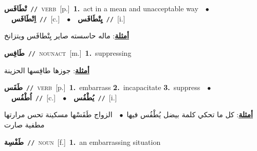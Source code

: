 \documentclass[10pt,a4paper,twoside]{article} %
\begin{document}
\begin{multicols}{2}
{\setlength\topsep{0pt}\textbf{\foreignlanguage{arabic}{تْطَافَس}}\ {\color{gray}\texttt{//}\color{black}}\ \textsc{verb}\ [p.]\ \textbf{1.}~act in a mean and unacceptable way\ \ $\bullet$\ \ \setlength\topsep{0pt}\textbf{\foreignlanguage{arabic}{اِتْطَافَس}}\ {\color{gray}\texttt{//}\color{black}}\ [c.]\ \ $\bullet$\ \ \setlength\topsep{0pt}\textbf{\foreignlanguage{arabic}{يِتْطَافَس}}\ {\color{gray}\texttt{//}\color{black}}\ [i.]\  \begin{flushright}\color{gray}\foreignlanguage{arabic}{\textbf{\underline{\foreignlanguage{arabic}{أمثلة}}}: ماله حاسسته صاير يِتْطافَس ويتزانخ}\end{flushright}\color{black}} \vspace{2mm}

{\setlength\topsep{0pt}\textbf{\foreignlanguage{arabic}{طَافِس}}\ {\color{gray}\texttt{//}\color{black}}\ \textsc{noun\textunderscore act}\ [m.]\ \textbf{1.}~suppressing\  \begin{flushright}\color{gray}\foreignlanguage{arabic}{\textbf{\underline{\foreignlanguage{arabic}{أمثلة}}}: جوزها طافِسها الحزينة}\end{flushright}\color{black}} \vspace{2mm}

{\setlength\topsep{0pt}\textbf{\foreignlanguage{arabic}{طَفَس}}\ {\color{gray}\texttt{//}\color{black}}\ \textsc{verb}\ [p.]\ \textbf{1.}~embarrass  \textbf{2.}~incapacitate  \textbf{3.}~suppress\ \ $\bullet$\ \ \setlength\topsep{0pt}\textbf{\foreignlanguage{arabic}{اُطْفُس}}\ {\color{gray}\texttt{//}\color{black}}\ [c.]\ \ $\bullet$\ \ \setlength\topsep{0pt}\textbf{\foreignlanguage{arabic}{يُطْفُس}}\ {\color{gray}\texttt{//}\color{black}}\ [i.]\  \begin{flushright}\color{gray}\foreignlanguage{arabic}{\textbf{\underline{\foreignlanguage{arabic}{أمثلة}}}: كل ما تحكي كلمة بيضل يُطْفُس فيها\ $\bullet$\ \  الزواج طَفَسْها مسكينة تحس مرارتها مطفية صارت}\end{flushright}\color{black}} \vspace{2mm}

{\setlength\topsep{0pt}\textbf{\foreignlanguage{arabic}{طَفْسِة}}\ {\color{gray}\texttt{//}\color{black}}\ \textsc{noun}\ [f.]\ \textbf{1.}~an embarrassing situation\ } \vspace{2mm}


\end{multicols}
\end{document}
